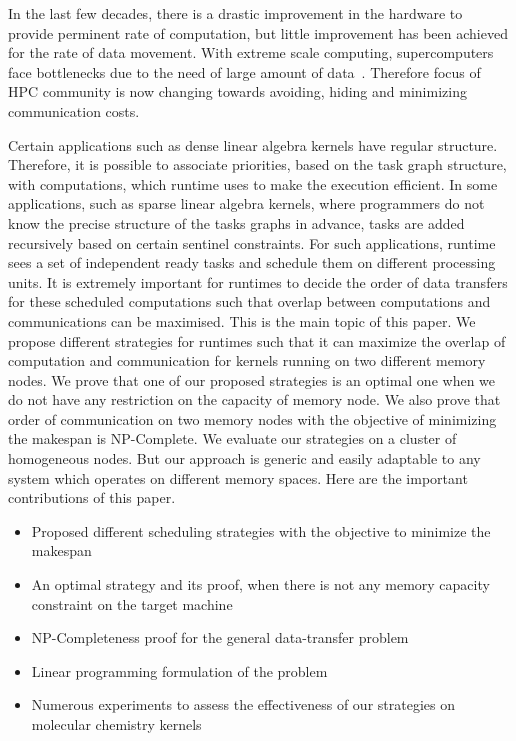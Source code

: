 \documentclass[runningheads]{llncs} %
\begin{document}
	 In the last few decades, there is a drastic improvement in the hardware to provide perminent rate of computation, but little improvement has been achieved for the rate of data movement. With extreme scale computing, supercomputers face bottlenecks due to the need of large amount of data~\cite{ascaccommitteereport2014,yelick2016}. Therefore focus of HPC community is now changing towards avoiding, hiding and minimizing communication costs.
	 
	
	Certain applications such as dense linear algebra kernels have regular structure. Therefore, it is possible to associate priorities, based on the task graph structure, with computations, which runtime uses to make the execution efficient. In some applications, such as sparse linear algebra kernels, where programmers do not know the precise structure of the tasks graphs in advance,  tasks are added recursively based on certain sentinel constraints. For such applications, runtime sees a set of independent ready tasks and schedule them on different processing units. It is extremely important for runtimes to decide the order of data transfers for these scheduled computations such that overlap between computations and communications can be maximised. This is the main topic of this paper. We propose different strategies for runtimes such that it can maximize the overlap of computation and communication for kernels running on two different memory nodes. We prove that one of our proposed strategies is an optimal one when we do not have any restriction on the capacity of memory node. We also prove that order of communication on two memory nodes  with the objective of minimizing the makespan is  NP-Complete. We evaluate our strategies on a cluster of homogeneous nodes. But our approach is generic and easily adaptable to any system which operates on different memory spaces. Here are the important contributions of this paper.
	
	\renewcommand{\labelitemi}{$\bullet$}
	\begin{itemize}
		\item Proposed different scheduling strategies with the objective to minimize the makespan
		\item An optimal strategy and its proof, when there is not any memory capacity constraint on the target machine
		\item NP-Completeness proof for the general data-transfer problem  
		\item Linear programming formulation of the problem
		\item Numerous  experiments to assess the effectiveness of our strategies on molecular chemistry kernels 
	\end{itemize}
\end{document}
